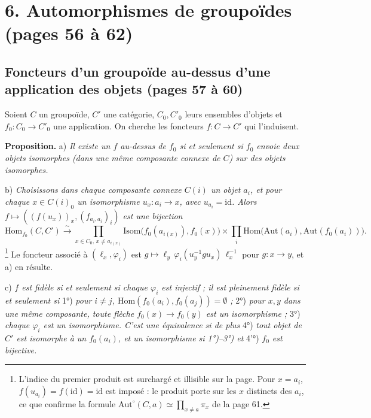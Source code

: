 \documentclass[11pt,a4paper]{article}
\begin{document}

\section*{6. Automorphismes de groupoïdes (pages 56 à 62)}

\subsection*{Foncteurs d'un groupoïde au-dessus d'une application des objets
(pages 57 à 60)}

Soient $C$ un groupoïde, $C'$ une catégorie, $C_{0}, C'_{0}$ leurs ensembles
d'objets et $f_{0} : C_{0} \to C'_{0}$ une application. On cherche les foncteurs
$f : C \to C'$ qui l'induisent.

\textbf{Proposition.} a) \emph{Il existe un $f$ au-dessus de $f_{0}$ si et
seulement si $f_{0}$ envoie deux objets isomorphes (dans une même composante
connexe de $C$) sur des objets isomorphes.}

b) \emph{Choisissons dans chaque composante connexe $C(i)$ un objet $a_{i}$, et
pour chaque $x \in C(i)_{0}$ un isomorphisme $u_{x} : a_{i} \to x$, avec
$u_{a_{i}} = \mathrm{id}$. Alors $f \mapsto ((f(u_{x}))_{x}, (f_{a_{i}, a_{i}})_{i})$
est une bijection}
\[
\mathrm{Hom}_{f_{0}}(C, C') \xrightarrow{\;\sim\;}
\prod_{x \in C_{0},\, x \neq a_{i(x)}} \mathrm{Isom}\bigl(f_{0}(a_{i(x)}), f_{0}(x)\bigr)
\times \prod_{i} \mathrm{Hom}\bigl(\mathrm{Aut}(a_{i}), \mathrm{Aut}(f_{0}(a_{i}))\bigr).
\]
\footnote{L'indice du premier produit est surchargé et illisible sur la page.
Pour $x = a_{i}$, $f(u_{a_{i}}) = f(\mathrm{id}) = \mathrm{id}$ est imposé : le
produit porte sur les $x$ distincts des $a_{i}$, ce que confirme la formule
$\mathrm{Aut}^{\circ}(C, a) \simeq \prod_{x \neq a} \pi_{x}$ de la page 61.}
Le foncteur associé à $(\ell_{x}, \varphi_{i})$ est $g \mapsto \ell_{y}\,
\varphi_{i}(u_{y}^{-1} g u_{x})\, \ell_{x}^{-1}$ pour $g : x \to y$, et a) en
résulte.

c) \emph{$f$ est fidèle si et seulement si chaque $\varphi_{i}$ est injectif ; il
est pleinement fidèle si et seulement si} 1°) \emph{pour $i \neq j$,
$\mathrm{Hom}(f_{0}(a_{i}), f_{0}(a_{j})) = \emptyset$ ;} 2°) \emph{pour $x, y$
dans une même composante, toute flèche $f_{0}(x) \to f_{0}(y)$ est un
isomorphisme ;} 3°) \emph{chaque $\varphi_{i}$ est un isomorphisme. C'est une
équivalence si de plus} 4°) \emph{tout objet de $C'$ est isomorphe à un
$f_{0}(a_{i})$, et un isomorphisme si 1°)--3°) et} 4'°) \emph{$f_{0}$ est
bijective.}
\end{document}
